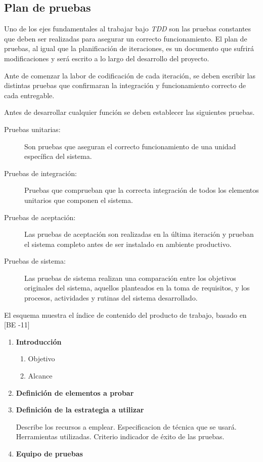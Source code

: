 \subsection{Plan de pruebas}

Uno de los ejes fundamentales al trabajar bajo \emph{TDD} son las pruebas constantes que deben ser realizadas para asegurar un correcto funcionamiento. El plan de pruebas, al igual que la planificación de iteraciones, es un documento que sufrirá modificaciones y será escrito a lo largo del desarrollo del proyecto.

Ante de comenzar la labor de codificación de cada iteración, se deben escribir las distintas pruebas que confirmaran la integración y funcionamiento correcto de cada entregable. 

Antes de desarrollar cualquier función se deben establecer las siguientes pruebas. 

\begin{description}
	\item[Pruebas unitarias:]\hfill

	Son pruebas que aseguran el correcto funcionamiento de una unidad específica del sistema. 

	\item[Pruebas de integración:]\hfill

	Pruebas que comprueban que la correcta integración de todos los elementos unitarios que componen el sistema.

	\item[Pruebas de aceptación:]\hfill

	Las pruebas de aceptación son realizadas en la última iteración y prueban el sistema completo antes de ser instalado en ambiente productivo.

	\item[Pruebas de sistema:]\hfill

	Las pruebas de sistema realizan una comparación entre los objetivos originales del sistema, aquellos planteados en la toma de requisitos, y los procesos, actividades y rutinas del sistema desarrollado.
\end{description}

El esquema muestra el índice de contenido del producto de trabajo, basado en [BE -11]

\begin{framed}
     \begin{enumerate}
		\item \textbf{Introducción}
		\begin{enumerate}
			\item Objetivo
			\item Alcance 
		\end{enumerate}
		\item \textbf{Definición de elementos a probar}	
		\item \textbf{Definición de la estrategia a utilizar}

		Describe los recursos a emplear. Especificacion de técnica que se usará. Herramientas utilizadas. Criterio indicador de éxito de las pruebas.
		\item \textbf{Equipo de pruebas}
	\end{enumerate}
\end{framed}

